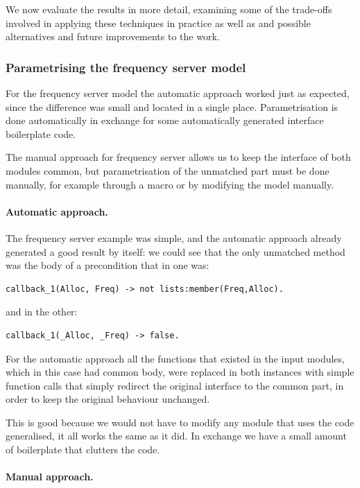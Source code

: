We now evaluate the results in more detail, examining some of the trade-offs involved in applying these techniques in practice as well as and 
possible alternatives and future improvements to the work.

\subsubsection{Parametrising the frequency server model}

For the frequency server model the automatic approach worked just as expected, 
since the difference was small and located in a single place. Parametrisation 
is done automatically in exchange for some automatically generated interface 
boilerplate code.

The manual approach for frequency server allows us to keep the 
interface of both modules {\color{red}common}, but parametrisation of the 
unmatched part must be done manually, for example through a macro or by 
modifying the model manually.

\paragraph{Automatic approach.}

The frequency server example was simple, and the automatic approach 
already generated a good result by itself: we could see that the only 
unmatched method was the body of a precondition that in one was:

\begin{verbatim}
callback_1(Alloc, Freq) -> not lists:member(Freq,Alloc).
\end{verbatim}

and in the other:

\begin{verbatim}
callback_1(_Alloc, _Freq) -> false.
\end{verbatim}


For the automatic approach all the functions that existed in the input modules, 
which in this case had common body, were replaced in both instances with simple 
function calls that simply redirect the original interface to the common part, 
in order to keep the original behaviour unchanged.

This is good because we would not have to modify any module that uses the code 
generalised, it all works the same as it did. In exchange we have a small 
amount of boilerplate that clutters the code.

\paragraph{Manual approach.}

